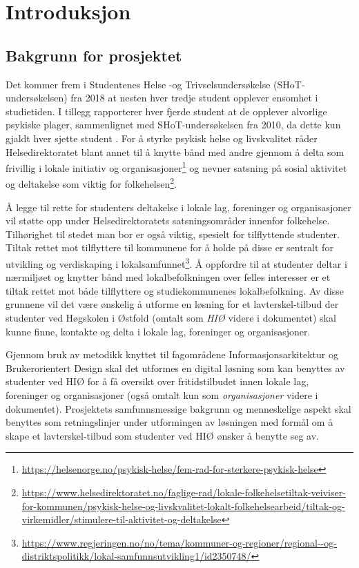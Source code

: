 \cleardoublepage
\chapter{Introduksjon}
\label{chap:intro}

\section{Bakgrunn for prosjektet}
Det kommer frem i Studentenes Helse -og Trivselsundersøkelse (SHoT-undersøkelsen) fra 2018 at nesten hver tredje student opplever ensomhet i studietiden. I tillegg rapporterer hver fjerde student at de opplever alvorlige psykiske plager, sammenlignet med SHoT-undersøkelsen fra 2010, da dette kun gjaldt hver sjette student \cite{SHOT:2}. For å styrke psykisk helse og livskvalitet råder Helsedirektoratet blant annet til å knytte bånd med andre gjennom å delta som frivillig i lokale initiativ og organisasjoner\footnote{\url{https://helsenorge.no/psykisk-helse/fem-rad-for-sterkere-psykisk-helse}} og nevner satsning på sosial aktivitet og deltakelse som viktig for folkehelsen\footnote{\url{https://www.helsedirektoratet.no/faglige-rad/lokale-folkehelsetiltak-veiviser-for-kommunen/psykisk-helse-og-livskvalitet-lokalt-folkehelsearbeid/tiltak-og-virkemidler/stimulere-til-aktivitet-og-deltakelse}}. 

Å legge til rette for studenters deltakelse i lokale lag, foreninger og organisasjoner vil støtte opp under Helsedirektoratets satsningsområder innenfor folkehelse. Tilhørighet til stedet man bor er også viktig, spesielt for tilflyttende studenter. Tiltak rettet mot tilflyttere til kommunene for å holde på disse er sentralt for utvikling og verdiskaping i lokalsamfunnet\footnote{\url{https://www.regjeringen.no/no/tema/kommuner-og-regioner/regional--og-distriktspolitikk/lokal-samfunnsutvikling1/id2350748/}}. Å oppfordre til at studenter deltar i nærmiljøet og knytter bånd med lokalbefolkningen over felles interesser er et tiltak rettet mot både tilflyttere og studiekommunenes lokalbefolkning. Av disse grunnene vil det være ønskelig å utforme en løsning for et lavterskel-tilbud der studenter ved Høgskolen i Østfold (omtalt som {\em HIØ} videre i dokumentet) skal kunne finne, kontakte og delta i lokale lag, foreninger og organisasjoner.

Gjennom bruk av metodikk knyttet til fagområdene Informasjonsarkitektur og Brukerorientert Design skal det utformes en digital løsning som kan benyttes av studenter ved HIØ for å få oversikt over fritidstilbudet innen lokale lag, foreninger og organisasjoner (også omtalt kun som {\em organisasjoner} videre i dokumentet). Prosjektets samfunnsmessige bakgrunn og menneskelige aspekt skal benyttes som retningslinjer under utformingen av løsningen med formål om å skape et lavterskel-tilbud som studenter ved HIØ ønsker å benytte seg av.


